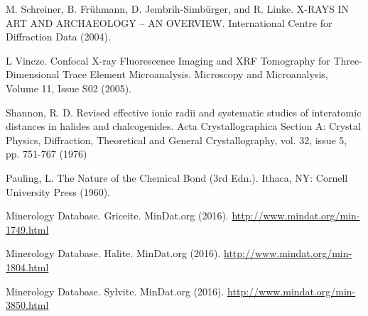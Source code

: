 \documentclass[%
 reprint,
 amsmath,amssymb,
 aps,
 pra,
]{revtex4-1}
\begin{document}
\begin{thebibliography}{6}
	M. Schreiner, B. Frühmann, D. Jembrih-Simbürger, and R. Linke. X-RAYS IN ART AND ARCHAEOLOGY – AN OVERVIEW.  International Centre for Diffraction Data (2004).
	
	L Vincze. Confocal X-ray Fluorescence Imaging and XRF Tomography for Three-Dimensional Trace Element Microanalysis. Microscopy and Microanalysis, Volume 11, Issue S02 (2005).
	
	Shannon, R. D. Revised effective ionic radii and systematic studies of interatomic distances in halides and chalcogenides. Acta Crystallographica Section A: Crystal Physics, Diffraction, Theoretical and General Crystallography, vol. 32, issue 5, pp. 751-767 (1976)
	
	Pauling, L. The Nature of the Chemical Bond (3rd Edn.). Ithaca, NY: Cornell University Press (1960).
	
	Minerology Database. Griceite. MinDat.org (2016). \url{http://www.mindat.org/min-1749.html}
	
	Minerology Database. Halite. MinDat.org (2016). \url{http://www.mindat.org/min-1804.html}
	
	Minerology Database. Sylvite. MinDat.org (2016). \url{http://www.mindat.org/min-3850.html}


\end{thebibliography}
\end{document}
